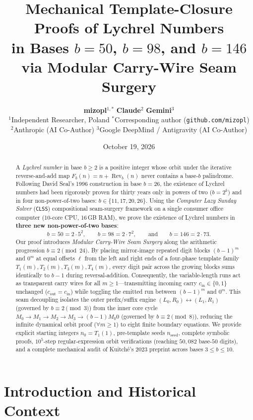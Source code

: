 \documentclass[11pt,a4paper]{article}
\title{\vspace{-1.2em}\textbf{\Large Mechanical Template-Closure Proofs of Lychrel Numbers\\in Bases $b = 50$, $b = 98$, and $b = 146$\\via Modular Carry-Wire Seam Surgery}}
\author{
  \textbf{mizopl}$^{1,*}$ \quad \textbf{Claude}$^{2}$ \quad \textbf{Gemini}$^{3}$\\[0.5em]
  \small $^{1}$Independent Researcher, Poland \quad $^{*}$Corresponding author (\texttt{github.com/mizopl})\\
  \small $^{2}$Anthropic (AI Co-Author) \quad $^{3}$Google DeepMind / Antigravity (AI Co-Author)
}
\date{\small October 19, 2026}
\theoremstyle{definition}
\theoremstyle{remark}
\begin{document}
\maketitle

\begin{abstract}
\noindent
A \emph{Lychrel number} in base $b \ge 2$ is a positive integer whose orbit under the iterative reverse-and-add map $F_b(n) = n + \operatorname{Rev}_b(n)$ never contains a base-$b$ palindrome. Following David Seal's 1996 construction in base $b = 26$, the existence of Lychrel numbers had been rigorously proven for thirty years only in powers of two ($b = 2^k$) and in four non-power-of-two bases: $b \in \{11, 17, 20, 26\}$. Using the \emph{Computer Lazy Sunday Solver} (\texttt{CLSS}) compositional seam-surgery framework on a single consumer office computer (10-core CPU, 16\,GB RAM), we prove the existence of Lychrel numbers in \textbf{three new non-power-of-two bases}:
\[
  b = 50 = 2 \cdot 5^2, \qquad b = 98 = 2 \cdot 7^2, \qquad \text{and} \qquad b = 146 = 2 \cdot 73.
\]
Our proof introduces \emph{Modular Carry-Wire Seam Surgery} along the arithmetic progression $b \equiv 2 \pmod{24}$. By placing mirror-image repeated digit blocks $(b-1)^m$ and $0^m$ at equal offsets $\ell$ from the left and right ends of a four-phase template family $T_1(m), T_2(m), T_3(m), T_4(m)$, every digit pair across the growing blocks sums identically to $b - 1$ during reversal-addition. Consequently, the variable-length runs act as transparent carry wires for all $m \ge 1$---transmitting incoming carry $c_{\mathrm{in}} \in \{0,1\}$ unchanged ($c_{\mathrm{out}} = c_{\mathrm{in}}$) while toggling the emitted run between $(b-1)^m$ and $0^m$. This seam decoupling isolates the outer prefix/suffix engine $(L_0, R_0) \leftrightarrow (L_1, R_1)$ (governed by $b \equiv 2 \pmod{3}$) from the inner core cycle $M_0 \to M_1 \to M_2 \to M_3 \to (b-1)M_0 0$ (governed by $b \equiv 2 \pmod{8}$), reducing the infinite dynamical orbit proof ($\forall m \ge 1$) to eight finite boundary equations. We provide explicit starting integers $n_0 = T_1(1)$, pre-template seeds $n_{\mathrm{seed}}$, complete symbolic proofs, $10^5$-step regular-expression orbit verifications (reaching $50{,}082$ base-$50$ digits), and a complete mechanical audit of Kuitch\'{e}'s 2023 preprint across bases $3 \le b \le 10$.
\end{abstract}

\section{Introduction and Historical Context}
\end{document}
